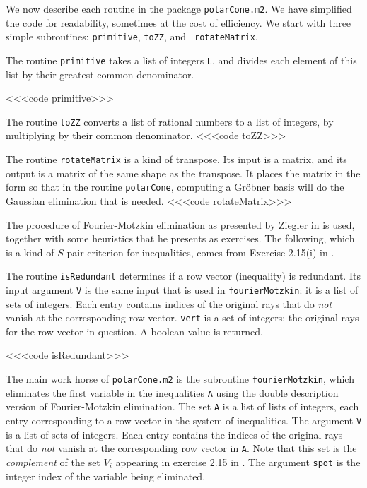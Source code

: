 We now describe each routine in the package {\tt polarCone.m2}.  We have
simplified the code for readability, sometimes at the cost of efficiency.
We start with three simple subroutines: {\tt primitive}, {\tt toZZ}, and {\tt
rotateMatrix}. 

\medskip
The routine {\tt primitive} takes a list of integers {\tt L}, and divides
each element of this list by their greatest common denominator.

<<<code primitive>>>

\medskip
The routine {\tt toZZ} converts a list of rational numbers to a list of 
integers, by multiplying by their common denominator.
<<<code toZZ>>>

\medskip
The routine {\tt rotateMatrix} is a kind of transpose.  Its input is a
matrix, and its output is a matrix of the same shape as the transpose.
It places the matrix in the form so that in the routine {\tt polarCone},
computing a Gr\"obner basis will do the Gaussian elimination that is needed.
<<<code rotateMatrix>>>

\medskip
The procedure of Fourier-Motzkin elimination as presented by 
Ziegler in \cite{HS:Zie} is used, together with some heuristics that he
presents as exercises.  The following, which is a kind of $S$-pair
criterion for inequalities, comes from Exercise 2.15(i) in \cite{HS:Zie}.

The routine {\tt isRedundant} determines if a row vector (inequality)
is redundant. Its input argument {\tt V} is the same input that is
used in {\tt fourierMotzkin}: it is a list of sets of integers.  Each
entry contains indices of the original rays that do {\sl not} vanish
at the corresponding row vector.  {\tt vert} is a set of integers; the
original rays for the row vector in question.  A boolean value is
returned.  

<<<code isRedundant>>>

\medskip
The main work horse of {\tt polarCone.m2} is the subroutine 
{\tt fourierMotzkin}, which eliminates the first variable in the
inequalities {\tt A} using the double description version of
Fourier-Motzkin elimination. The set {\tt A} is a list of lists of
integers, each entry corresponding to a row vector in the system of
inequalities.  The argument {\tt V} is a list of sets of integers.
Each entry contains the indices of the original rays that do {\sl
  not} vanish at the corresponding row vector in {\tt A}.  Note that
this set is the {\sl complement} of the set $V_i$ appearing in
exercise 2.15 in \cite{HS:Zie}. The argument {\tt spot} is the integer
index of the variable being eliminated.  

